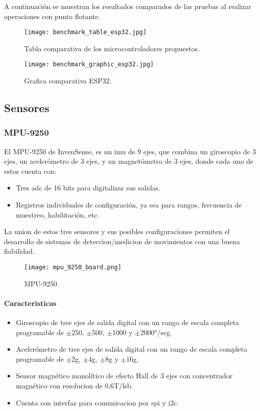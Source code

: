 A continuación se muestran los resultados comparados de las pruebas al realizar operaciones con punto flotante.
\begin{figure}[htp!]
    \centering
    \texttt{[image: benchmark\_table\_esp32.jpg]}
    \caption{Tabla comparativa de los microcontroladores propuestos.}
    \label{fig: table_benchmark}
\end{figure}
\FloatBarrier

\begin{figure}[htp!]
    \centering
    \texttt{[image: benchmark\_graphic\_esp32.jpg]}
    \caption{Grafica comparativa ESP32.}
    \label{fig: graphic_benchmark}
\end{figure}
\FloatBarrier

\subsection{Sensores}
\subsubsection{MPU-9250}
El MPU-9250 de InvenSense, es un \acrshort{imu} de 9 ejes, que combina
un giroscopio de 3 ejes, un acelerómetro de 3 ejes, y un magnetómetro de 3 ejes, donde cada
uno de estos cuenta con:
\begin{itemize}
    \item Tres \acrshort{adc} de 16 bits para digitalizar sus salidas.
    \item Registros individuales de configuración, ya sea para rangos, frecuencia de muestreo, habilitación, etc.
\end{itemize}

La union de estos tres sensores y sus posibles configuraciones permiten el desarrollo de sistemas de deteccion/medicion de
movimientos con una buena fiabilidad.

\begin{figure}[htp]
    \centering
    \texttt{[image: mpu\_9250\_board.png]}
    \caption{MPU-9250. }
\end{figure}

\paragraph{Caracteristicas}
\begin{itemize}
    \item Giroscopio de tres ejes de salida digital con un rango de escala completa programable de $ \pm $250, $ \pm $500, $ \pm $1000 y $ \pm $2000°/seg.
    \item Acelerómetro de tres ejes de salida digital con un rango de escala completa programable de $ \pm $2g, $ \pm $4g, $ \pm $8g y $ \pm $16g.
    \item Sensor magnético monolítico de efecto Hall de 3 ejes con concentrador magnético con resolucion de 0,6T/\acrshort{lsb}.
    \item Cuenta con interfaz para comunicacion por \acrshort{spi} y \acrshort{i2c}.
\end{itemize}

